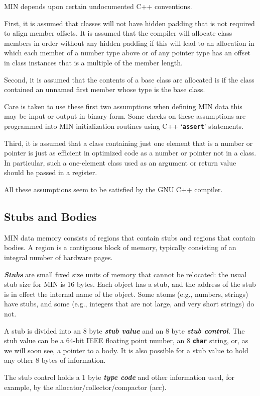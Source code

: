 \documentclass[12pt]{article}
\newcommand{\TT}[1]{{\tt \bfseries #1}}
\newcommand{\key}[1]{{\bf \em #1}\index{#1}}
\newcommand{\ikey}[2]{{\bf \em #1}\index{#2}}
\begin{document}
MIN depends upon certain undocumented C++ conventions.

First, it is assumed that classes will not have hidden
padding that is not required to align member offsets.
It is assumed that the compiler will allocate class members
in order without any hidden padding if this will lead to
an allocation in which each member of a number type above or
of any pointer type has an offset in class instances
that is a multiple of the member length.

Second, it is assumed that the contents of a base class are
allocated is if the class contained an unnamed first member
whose type is the base class.

Care is taken to use these first two assumptions when defining
MIN data this may be input or output in binary form.
Some checks on these assumptions are programmed into MIN
initialization routines using C++ `\TT{assert}' statements.

Third, it is assumed that a class containing just one element
that is a number or pointer is just as efficient in optimized
code as a number or pointer not in a class.  In particular,
such a one-element class used as an argument or return value
should be passed in a register.

All these assumptions seem to be satisfied by the GNU C++
compiler.

\subsection{Stubs and Bodies}

MIN data memory consists of regions that contain stubs and regions
that contain bodies.  A region is a contiguous block
of memory, typically consisting of an integral number of hardware
pages.

\ikey{Stubs}{stub}
are small fixed size units of memory that cannot be relocated:
the usual stub size for MIN is 16 bytes.
Each object has a stub, and the address of the stub is in effect
the internal name of the object.  Some atoms (e.g., numbers, strings)
have stubs, and some (e.g., integers that are not large, and very short
strings) do not.

A stub is divided into an 8 byte \key{stub value}
and an 8 byte \key{stub control}.
The stub value can be a 64-bit IEEE floating point number,
an 8 \TT{char} string, or, as we will soon see, a pointer to a body.
It is also possible for a stub value to hold any other 8 bytes of information.

The stub control holds a 1 byte \key{type code} and other information used,
for example, by the allocator/collector/compactor (acc).
\end{document}
